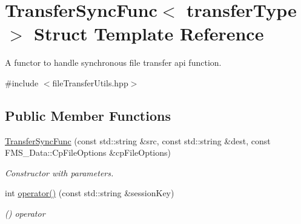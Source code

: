 \hypertarget{structTransferSyncFunc}{
\section{TransferSyncFunc$<$ transferType $>$ Struct Template Reference}
\label{structTransferSyncFunc}
}


A functor to handle synchronous file transfer api function.  




{\ttfamily \#include $<$fileTransferUtils.hpp$>$}

\subsection*{Public Member Functions}
\begin{DoxyCompactItemize}
\item 
\hyperlink{structTransferSyncFunc_aa8e218ca0fdfe1397d80cfa14b1e3c45}{TransferSyncFunc} (const std::string \&src, const std::string \&dest, const FMS\_\-Data::CpFileOptions \&cpFileOptions)
\begin{DoxyCompactList}\small\item\em Constructor with parameters. \item\end{DoxyCompactList}\item 
int \hyperlink{structTransferSyncFunc_a6dbdbcdf12b2f1ec7c2fb92467f0e638}{operator()} (const std::string \&sessionKey)
\begin{DoxyCompactList}\small\item\em () operator \item\end{DoxyCompactList}\end{DoxyCompactItemize}
